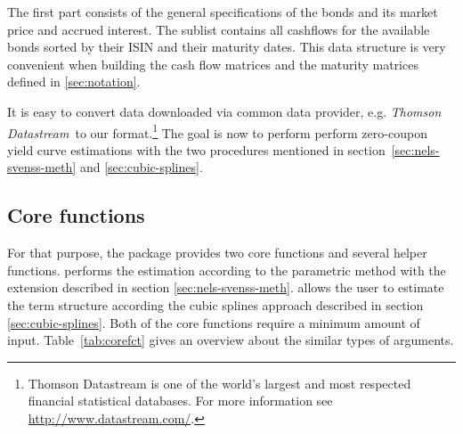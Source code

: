 The first part consists of the general specifications of the bonds and its market price and accrued interest. The sublist  contains all cashflows for the available bonds sorted by their ISIN and their maturity dates. This data structure is very convenient when building the cash flow matrices and the maturity matrices defined in \ref{sec:notation}.

It is easy to convert data downloaded via common data provider, e.g. \emph{Thomson Datastream}\texttrademark\, to our format.\footnote{Thomson Datastream is one of the world's largest and most respected financial statistical databases. For more information see \url{http://www.datastream.com/}.} The goal is now to perform perform zero-coupon yield curve estimations with the two procedures mentioned in section~\ref{sec:nels-svenss-meth} and \ref{sec:cubic-splines}.

\newpage
\subsection{Core functions}
\label{sec:main-functions}

For that purpose, the package  provides two core functions and several helper functions.  performs the estimation according to the parametric \cite{Nelson1987} method with the \cite{Svensson1994} extension described in section \ref{sec:nels-svenss-meth}.   allows the user to estimate the term structure according the \cite{McCulloch1975} cubic splines approach described in section \ref{sec:cubic-splines}. Both of the core functions require a minimum amount of input. Table~\ref{tab:corefct} gives an overview about the similar types of arguments.

